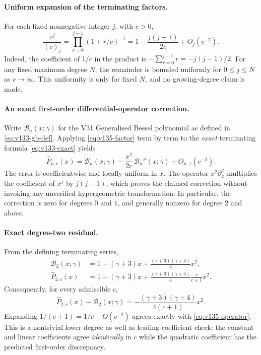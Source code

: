 \documentclass[11pt]{article}
\begin{document}
\paragraph{Uniform expansion of the terminating factors.}
For each fixed nonnegative integer $j$, with $c>0$,
\begin{equation}\label{eq:v135-factor}
 \frac{c^j}{(c)_j}=\prod_{r=0}^{j-1}(1+r/c)^{-1}
 =1-\frac{j(j-1)}{2c}+O_j(c^{-2}).
\end{equation}
Indeed, the coefficient of $1/c$ in the product is
$-\sum_{r=0}^{j-1}r=-j(j-1)/2$.  For any fixed maximum degree $N$,
the remainder is bounded uniformly for $0\le j\le N$ as $c\to\infty$.
This uniformity is only for fixed $N$, and no growing-degree claim is made.

\paragraph{An exact first-order differential-operator correction.}
Write $\mathcal B_n(x;\gamma)$ for the V31 Generalised Bessel polynomial
as defined in \eqref{eq:v133-gb-def}.  Applying
\eqref{eq:v135-factor} term by term to the \emph{exact} terminating
formula \eqref{eq:v133-exact} yields
\begin{equation}\label{eq:v135-operator}
 \boxed{\widehat P_{n,c}(x)=\mathcal B_n(x;\gamma)
 -\frac{x^2}{2c}\,\mathcal B_n''(x;\gamma)
 +O_{n,\gamma}(c^{-2}).}
\end{equation}
The error is coefficientwise and locally uniform in $x$.  The operator
$x^2\partial_x^2$ multiplies the coefficient of $x^j$ by $j(j-1)$,
which proves the claimed correction without invoking any unverified
hypergeometric transformation.  In particular, the correction is zero
for degrees $0$ and $1$, and generally nonzero for degree $2$ and above.

\paragraph{Exact degree-two residual.}
From the defining terminating series,
\begin{align}
 \mathcal B_2(x;\gamma)
 &=1+(\gamma+3)x+\frac{(\gamma+3)(\gamma+4)}4x^2,\\
 \widehat P_{2,c}(x)
 &=1+(\gamma+3)x
 +\frac{(\gamma+3)(\gamma+4)}4\frac{c}{c+1}x^2.
\end{align}
Consequently, for every admissible $c$,
\begin{equation}\label{eq:v135-degree-two}
 \boxed{\widehat P_{2,c}(x)-\mathcal B_2(x;\gamma)
 =-\frac{(\gamma+3)(\gamma+4)}{4(c+1)}x^2.}
\end{equation}
Expanding $1/(c+1)=1/c+O(c^{-2})$ agrees exactly with
\eqref{eq:v135-operator}.  This is a nontrivial lower-degree as well as
leading-coefficient check: the constant and linear coefficients agree
\emph{identically} in $c$ while the quadratic coefficient has the
predicted first-order discrepancy.
\end{document}

